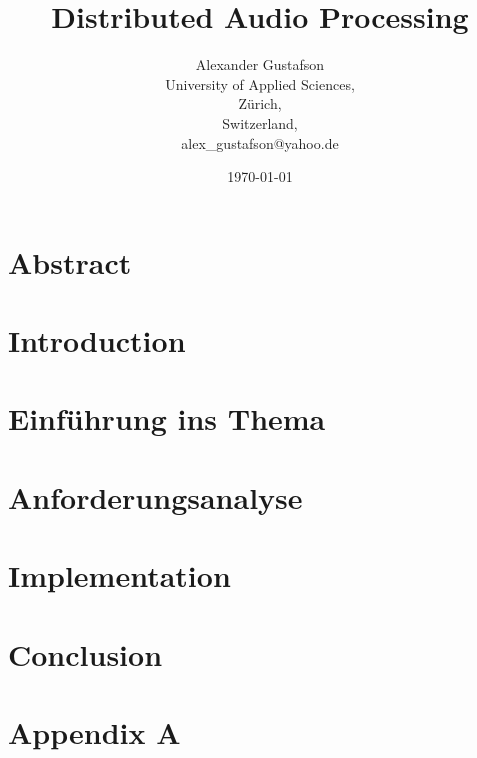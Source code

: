 \documentclass{report}
\begin{document}
\title{Distributed Audio Processing}
\author{Alexander Gustafson\\
  University of Applied Sciences,\\
  Zürich,\\
  Switzerland,\\
  alex\_gustafson@yahoo.de}
\date{\today}
\maketitle

\chapter*{Abstract}



\tableofcontents

\chapter{Introduction}



\chapter{Einführung ins Thema}






\chapter{Anforderungsanalyse}







\chapter{Implementation}












\chapter{Conclusion}


{}


\chapter{Appendix A}



\end{document}

